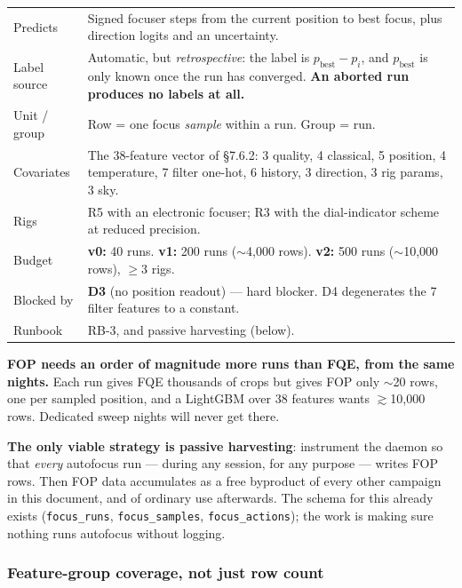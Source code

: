 \documentclass[11pt]{article}
\newcommand{\co}[1]{\texttt{\small #1}}
\begin{document}
\begin{center}
\small
\begin{tabular}{@{}p{}p{}@{}}
\toprule
Predicts & Signed focuser steps from the current position to best focus, plus direction logits and an uncertainty. \\
Label source & Automatic, but \emph{retrospective}: the label is $p_{\mathrm{best}} - p_i$, and $p_{\mathrm{best}}$ is only known once the run has converged. \textbf{An aborted run produces no labels at all.} \\
Unit / group & Row = one focus \emph{sample} within a run. Group = run. \\
Covariates & The 38-feature vector of \S7.6.2: 3 quality, 4 classical, 5 position, 4 temperature, 7 filter one-hot, 6 history, 3 direction, 3 rig params, 3 sky. \\
Rigs & R5 with an electronic focuser; R3 with the dial-indicator scheme at reduced precision. \\
Budget & \textbf{v0:} 40 runs. \textbf{v1:} 200 runs ($\sim$4,000 rows). \textbf{v2:} 500 runs ($\sim$10,000 rows), $\geq$3 rigs. \\
Blocked by & \textbf{D3} (no position readout) --- hard blocker. D4 degenerates the 7 filter features to a constant. \\
Runbook & RB-3, and passive harvesting (below). \\
\bottomrule
\end{tabular}
\end{center}

\begin{redbox}
\textbf{FOP needs an order of magnitude more runs than FQE, from the same
nights.} Each run gives FQE thousands of crops but gives FOP only $\sim$20 rows,
one per sampled position, and a LightGBM over 38 features wants $\gtrsim$10,000
rows. Dedicated sweep nights will never get there.

\textbf{The only viable strategy is passive harvesting}: instrument the daemon
so that \emph{every} autofocus run --- during any session, for any purpose ---
writes FOP rows. Then FOP data accumulates as a free byproduct of every other
campaign in this document, and of ordinary use afterwards. The schema for this
already exists (\co{focus\_runs}, \co{focus\_samples}, \co{focus\_actions}); the
work is making sure nothing runs autofocus without logging.
\end{redbox}

\subsubsection*{Feature-group coverage, not just row count}
\end{document}
